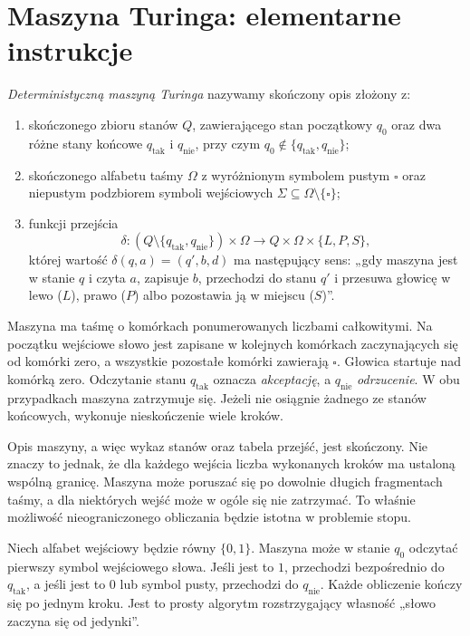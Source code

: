 \section{Maszyna Turinga: elementarne instrukcje}
\begin{definicja}\label{def:computability-tm}
\emph{Deterministyczną maszyną Turinga} nazywamy skończony opis
złożony z:
\begin{enumerate}[label=(\roman*)]
\item skończonego zbioru stanów $Q$, zawierającego
stan początkowy $q_0$ oraz dwa różne stany końcowe
$q_{\mathrm{tak}}$ i $q_{\mathrm{nie}}$, przy czym
$q_0\notin\{q_{\mathrm{tak}},q_{\mathrm{nie}}\}$;
\item skończonego alfabetu taśmy $\Omega$ z wyróżnionym
symbolem pustym $\square$ oraz niepustym podzbiorem symboli wejściowych
$\Sigma\subseteq\Omega\setminus\{\square\}$;
\item funkcji przejścia
\[
\delta:(Q\setminus\{q_{\mathrm{tak}},q_{\mathrm{nie}}\})\times\Omega
\longrightarrow Q\times\Omega\times\{L,P,S\},
\]
której wartość $\delta(q,a)=(q',b,d)$ ma następujący sens:
„gdy maszyna jest w stanie $q$ i czyta $a$, zapisuje $b$,
przechodzi do stanu $q'$ i przesuwa głowicę
w lewo ($L$), prawo ($P$) albo pozostawia ją w miejscu ($S$)”.
\end{enumerate}
Maszyna ma taśmę o komórkach ponumerowanych liczbami
całkowitymi. Na początku wejściowe słowo jest zapisane
w kolejnych komórkach zaczynających się od komórki zero,
a wszystkie pozostałe komórki zawierają $\square$.
Głowica startuje nad komórką zero. Odczytanie stanu
$q_{\mathrm{tak}}$ oznacza \emph{akceptację}, a
$q_{\mathrm{nie}}$ \emph{odrzucenie}. W obu przypadkach
maszyna zatrzymuje się. Jeżeli nie osiągnie żadnego
ze stanów końcowych, wykonuje nieskończenie wiele kroków.
\end{definicja}

\begin{uwaga}
Opis maszyny, a więc wykaz stanów oraz tabela przejść,
jest skończony. Nie znaczy to jednak, że dla każdego wejścia
liczba wykonanych kroków ma ustaloną wspólną granicę.
Maszyna może poruszać się po dowolnie długich fragmentach
taśmy, a dla niektórych wejść może w ogóle się nie zatrzymać.
To właśnie możliwość nieograniczonego obliczania będzie istotna
w problemie stopu.
\end{uwaga}

\begin{przyklad}
Niech alfabet wejściowy będzie równy $\{0,1\}$.
Maszyna może w stanie $q_0$ odczytać pierwszy symbol
wejściowego słowa. Jeśli jest to $1$, przechodzi
bezpośrednio do $q_{\mathrm{tak}}$, a jeśli jest to $0$
lub symbol pusty, przechodzi do $q_{\mathrm{nie}}$.
Każde obliczenie kończy się po jednym kroku.
Jest to prosty algorytm rozstrzygający własność
„słowo zaczyna się od jedynki”.
\end{przyklad}

